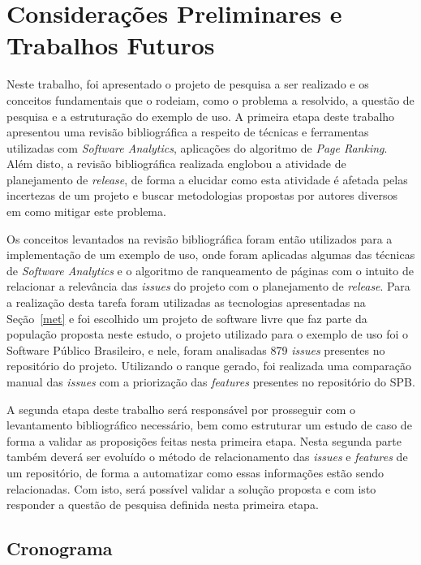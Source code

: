 \chapter{Considerações Preliminares e Trabalhos Futuros}

Neste trabalho, foi apresentado o projeto de pesquisa a ser realizado e os conceitos fundamentais que o rodeiam, como o problema a resolvido, a questão de pesquisa e a estruturação do exemplo de uso. A primeira etapa deste trabalho apresentou uma revisão bibliográfica a respeito de técnicas e ferramentas utilizadas com \textit{Software Analytics}, aplicações do algoritmo de \textit{Page Ranking}. Além disto, a revisão bibliográfica realizada englobou a atividade de planejamento de \textit{release}, de forma a elucidar como esta atividade é afetada pelas incertezas de um projeto e buscar metodologias propostas por autores diversos em como mitigar este problema. 

Os conceitos levantados na revisão bibliográfica foram então utilizados para a implementação de um exemplo de uso, onde foram aplicadas algumas das técnicas de \textit{Software Analytics} e o algoritmo de ranqueamento de páginas com o intuito de relacionar a relevância das \textit{issues} do projeto com o planejamento de \textit{release}. Para a realização desta tarefa foram utilizadas as tecnologias apresentadas na Seção~\ref{met} e foi escolhido um projeto de software livre que faz parte da população proposta neste estudo, o projeto utilizado para o exemplo de uso foi o Software Público Brasileiro, e nele, foram analisadas 879 \textit{issues} presentes no repositório do projeto. Utilizando o ranque gerado, foi realizada uma comparação manual das  \textit{issues} com a priorização das \textit{features} presentes no repositório do SPB.

A segunda etapa deste trabalho será responsável por prosseguir com o levantamento bibliográfico necessário, bem como estruturar um estudo de caso de forma a validar as proposições feitas nesta primeira etapa. Nesta segunda parte também deverá ser evoluído o método de relacionamento das \textit{issues} e \textit{features} de um repositório, de forma a automatizar como essas informações estão sendo relacionadas. Com isto, será possível validar a solução proposta e com isto responder a questão de pesquisa definida nesta primeira etapa.
\newpage
\section{Cronograma}

